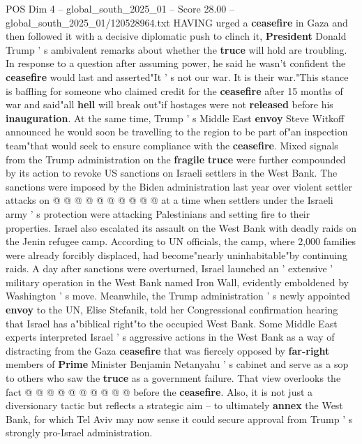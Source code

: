 \begin{textsample}{POS Dim 4 – global\_south\_2025\_01 – Score 28.00 – global\_south\_2025\_01/120528964.txt}  \label{ex:f4_pos_007}
HAVING urged a \textbf{ceasefire} in Gaza and then followed it with a decisive diplomatic push to clinch it, \textbf{President} Donald Trump ' s ambivalent remarks about whether the \textbf{truce} will hold are troubling.
In response to a question after assuming power, he said he wasn't confident the \textbf{ceasefire} would last and asserted"It ' s not our war.
It is their war."This stance is baffling for someone who claimed credit for the \textbf{ceasefire} after 15 months of war and said"all \textbf{hell} will break out"if hostages were not \textbf{released} before his \textbf{inauguration}.
At the same time, Trump ' s Middle East \textbf{envoy} Steve Witkoff announced he would soon be travelling to the region to be part of"an inspection team"that would seek to ensure compliance with the \textbf{ceasefire}.
Mixed signals from the Trump administration on the \textbf{fragile} \textbf{truce} were further compounded by its action to revoke US sanctions on Israeli settlers in the West Bank.
The sanctions were imposed by the Biden administration last year over violent settler attacks on @ @ @ @ @ @ @ @ @ @ at a time when settlers under the Israeli army ' s protection were attacking Palestinians and setting fire to their properties.
Israel also escalated its assault on the West Bank with deadly raids on the Jenin refugee camp.
According to UN officials, the camp, where 2,000 families were already forcibly displaced, had become"nearly uninhabitable"by continuing raids.
A day after sanctions were overturned, Israel launched an ' extensive ' military operation in the West Bank named Iron Wall, evidently emboldened by Washington ' s move.
Meanwhile, the Trump administration ' s newly appointed \textbf{envoy} to the UN, Elise Stefanik, told her Congressional confirmation hearing that Israel has a"biblical right"to the occupied West Bank.
Some Middle East experts interpreted Israel ' s aggressive actions in the West Bank as a way of distracting from the Gaza \textbf{ceasefire} that was fiercely opposed by \textbf{far-right} members of \textbf{Prime} Minister Benjamin Netanyahu ' s cabinet and serve as a sop to others who saw the \textbf{truce} as a government failure.
That view overlooks the fact @ @ @ @ @ @ @ @ @ @ before the \textbf{ceasefire}.
Also, it is not just a diversionary tactic but reflects a strategic aim -- to ultimately \textbf{annex} the West Bank, for which Tel Aviv may now sense it could secure approval from Trump ' s strongly pro-Israel administration.

\end{textsample}
